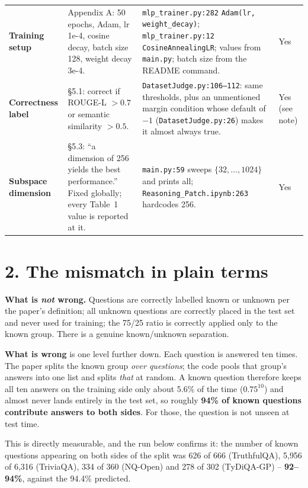 \documentclass[11pt,a4paper]{article}
\begin{document}
\begin{table}[h]
\begin{tabular}{L{2.2cm} L{4.7cm} L{5.4cm} L{1.6cm}}
\textbf{Training setup}
& Appendix A: 50 epochs, Adam, lr 1e-4, cosine decay, batch size 128, weight decay 3e-4.
& \texttt{mlp\_trainer.py:282} \texttt{Adam(lr, weight\_decay)}; \texttt{mlp\_trainer.py:12}
\texttt{CosineAnnealingLR}; values from \texttt{main.py}; batch size from the README command.
& Yes \\

\textbf{Correctness label}
& \S5.1: correct if ROUGE-L $>0.7$ or semantic similarity $>0.5$.
& \texttt{DatasetJudge.py:106--112}: same thresholds, plus an unmentioned margin condition whose
default of $-1$ (\texttt{DatasetJudge.py:26}) makes it almost always true.
& Yes (see note) \\

\textbf{Subspace dimension}
& \S5.3: ``a dimension of 256 yields the best performance.'' Fixed globally; every Table~1 value is
reported at it.
& \texttt{main.py:59} sweeps $\{32,\dots,1024\}$ and prints all; \texttt{Reasoning\_Patch.ipynb:263}
hardcodes 256.
& Yes \\

\bottomrule
\end{tabular}
\end{table}

\section*{2. The mismatch in plain terms}

\noindent\textbf{What is \emph{not} wrong.} Questions are correctly labelled known or unknown per the
paper's definition; all unknown questions are correctly placed in the test set and never used for
training; the 75/25 ratio is correctly applied only to the known group. There is a genuine
known/unknown separation.

\medskip
\noindent\textbf{What is wrong} is one level further down. Each question is answered ten times. The
paper splits the known group \emph{over questions}; the code pools that group's answers into one list
and splits \emph{that} at random. A known question therefore keeps all ten answers on the training
side only about 5.6\% of the time ($0.75^{10}$) and almost never lands entirely in the test set, so
roughly \textbf{94\% of known questions contribute answers to both sides}. For those, the question is
not unseen at test time.

\medskip
\noindent This is directly measurable, and the run below confirms it: the number of known questions
appearing on both sides of the split was 626 of 666 (TruthfulQA), 5{,}956 of 6{,}316 (TriviaQA), 334
of 360 (NQ-Open) and 278 of 302 (TyDiQA-GP) -- \textbf{92--94\%}, against the 94.4\% predicted.
\end{document}

